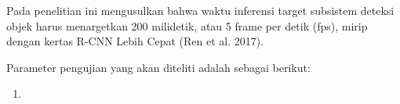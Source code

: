 Pada penelitian ini mengusulkan bahwa waktu inferensi target subsistem deteksi objek harus menargetkan 200 milidetik, atau 5 frame per detik (fps), mirip dengan kertas R-CNN Lebih Cepat (Ren et al. 2017).

Parameter pengujian yang akan diteliti adalah sebagai berikut:
\begin{enumerate}
	
	
	
	
	\item 
\end{enumerate}

